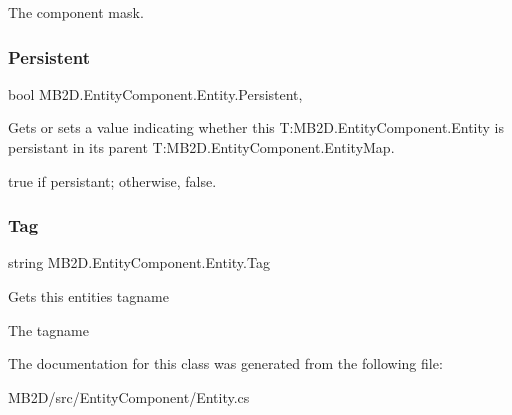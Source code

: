 The component mask.\hypertarget{class_m_b2_d_1_1_entity_component_1_1_entity_af72e02dfa9b3b5a24e7c97eb6ce2fd3a}{}\label{class_m_b2_d_1_1_entity_component_1_1_entity_af72e02dfa9b3b5a24e7c97eb6ce2fd3a} 
\subsubsection{\texorpdfstring{Persistent}{Persistent}}
{\footnotesize\ttfamily bool M\+B2\+D.\+Entity\+Component.\+Entity.\+Persistent\hspace{0.3cm}{\ttfamily [get]}, {\ttfamily [set]}}



Gets or sets a value indicating whether this T\+:\+M\+B2\+D.\+Entity\+Component.\+Entity is persistant in its parent T\+:\+M\+B2\+D.\+Entity\+Component.\+Entity\+Map. 

{\ttfamily true} if persistant; otherwise, {\ttfamily false}.\hypertarget{class_m_b2_d_1_1_entity_component_1_1_entity_aa16727c7f2228b661fe6b374721fb4f7}{}\label{class_m_b2_d_1_1_entity_component_1_1_entity_aa16727c7f2228b661fe6b374721fb4f7} 
\subsubsection{\texorpdfstring{Tag}{Tag}}
{\footnotesize\ttfamily string M\+B2\+D.\+Entity\+Component.\+Entity.\+Tag\hspace{0.3cm}{\ttfamily [get]}}



Gets this entities tagname 

The tagname

The documentation for this class was generated from the following file\+:\begin{DoxyCompactItemize}
\item 
M\+B2\+D/src/\+Entity\+Component/Entity.\+cs\end{DoxyCompactItemize}
